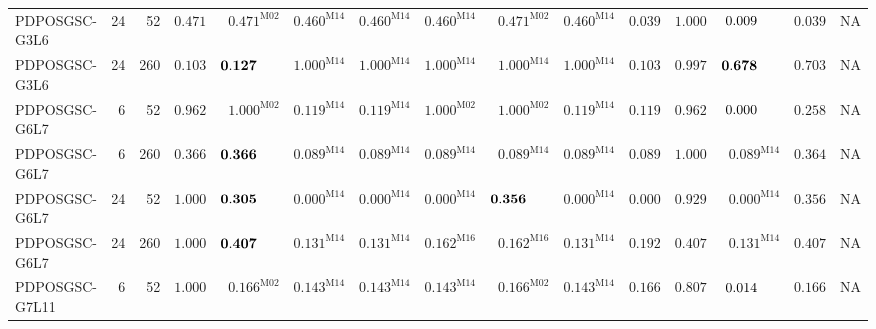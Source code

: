 \begin{longtable}{@{}lrrrrrrrrrrrrrr@{}}
PDPOSGSC-G3L6 & 24 & 52 & $\mathbf{0.471}$ & $\mathbf{0.471}^{\mathrm{M02}}$ & $\mathbf{0.460}^{\mathrm{M14}}$ & $\mathbf{0.460}^{\mathrm{M14}}$ & $\mathbf{0.460}^{\mathrm{M14}}$ & $\mathbf{0.471}^{\mathrm{M02}}$ & $\mathbf{0.460}^{\mathrm{M14}}$ & $0.039$ & $\mathbf{1.000}$ & $0.009\hphantom{^{\mathrm{M00}}}$ & $0.039$ & \textsc{NA} \\
PDPOSGSC-G3L6 & 24 & 260 & $\mathbf{0.103}$ & $\mathbf{0.127}\hphantom{^{\mathrm{M00}}}$ & $\mathbf{1.000}^{\mathrm{M14}}$ & $\mathbf{1.000}^{\mathrm{M14}}$ & $\mathbf{1.000}^{\mathrm{M14}}$ & $\mathbf{1.000}^{\mathrm{M14}}$ & $\mathbf{1.000}^{\mathrm{M14}}$ & $\mathbf{0.103}$ & $\mathbf{0.997}$ & $\mathbf{0.678}\hphantom{^{\mathrm{M00}}}$ & $\mathbf{0.703}$ & \textsc{NA} \\
PDPOSGSC-G6L7 & 6 & 52 & $\mathbf{0.962}$ & $\mathbf{1.000}^{\mathrm{M02}}$ & $\mathbf{0.119}^{\mathrm{M14}}$ & $\mathbf{0.119}^{\mathrm{M14}}$ & $\mathbf{1.000}^{\mathrm{M02}}$ & $\mathbf{1.000}^{\mathrm{M02}}$ & $\mathbf{0.119}^{\mathrm{M14}}$ & $\mathbf{0.119}$ & $\mathbf{0.962}$ & $0.000\hphantom{^{\mathrm{M00}}}$ & $\mathbf{0.258}$ & \textsc{NA} \\
PDPOSGSC-G6L7 & 6 & 260 & $\mathbf{0.366}$ & $\mathbf{0.366}\hphantom{^{\mathrm{M00}}}$ & $0.089^{\mathrm{M14}}$ & $0.089^{\mathrm{M14}}$ & $0.089^{\mathrm{M14}}$ & $0.089^{\mathrm{M14}}$ & $0.089^{\mathrm{M14}}$ & $0.089$ & $\mathbf{1.000}$ & $0.089^{\mathrm{M14}}$ & $\mathbf{0.364}$ & \textsc{NA} \\
PDPOSGSC-G6L7 & 24 & 52 & $\mathbf{1.000}$ & $\mathbf{0.305}\hphantom{^{\mathrm{M00}}}$ & $0.000^{\mathrm{M14}}$ & $0.000^{\mathrm{M14}}$ & $0.000^{\mathrm{M14}}$ & $\mathbf{0.356}\hphantom{^{\mathrm{M00}}}$ & $0.000^{\mathrm{M14}}$ & $0.000$ & $\mathbf{0.929}$ & $0.000^{\mathrm{M14}}$ & $\mathbf{0.356}$ & \textsc{NA} \\
PDPOSGSC-G6L7 & 24 & 260 & $\mathbf{1.000}$ & $\mathbf{0.407}\hphantom{^{\mathrm{M00}}}$ & $\mathbf{0.131}^{\mathrm{M14}}$ & $\mathbf{0.131}^{\mathrm{M14}}$ & $\mathbf{0.162}^{\mathrm{M16}}$ & $\mathbf{0.162}^{\mathrm{M16}}$ & $\mathbf{0.131}^{\mathrm{M14}}$ & $\mathbf{0.192}$ & $\mathbf{0.407}$ & $\mathbf{0.131}^{\mathrm{M14}}$ & $\mathbf{0.407}$ & \textsc{NA} \\
PDPOSGSC-G7L11 & 6 & 52 & $\mathbf{1.000}$ & $\mathbf{0.166}^{\mathrm{M02}}$ & $\mathbf{0.143}^{\mathrm{M14}}$ & $\mathbf{0.143}^{\mathrm{M14}}$ & $\mathbf{0.143}^{\mathrm{M14}}$ & $\mathbf{0.166}^{\mathrm{M02}}$ & $\mathbf{0.143}^{\mathrm{M14}}$ & $\mathbf{0.166}$ & $\mathbf{0.807}$ & $0.014\hphantom{^{\mathrm{M00}}}$ & $\mathbf{0.166}$ & \textsc{NA} \\

\end{longtable}

